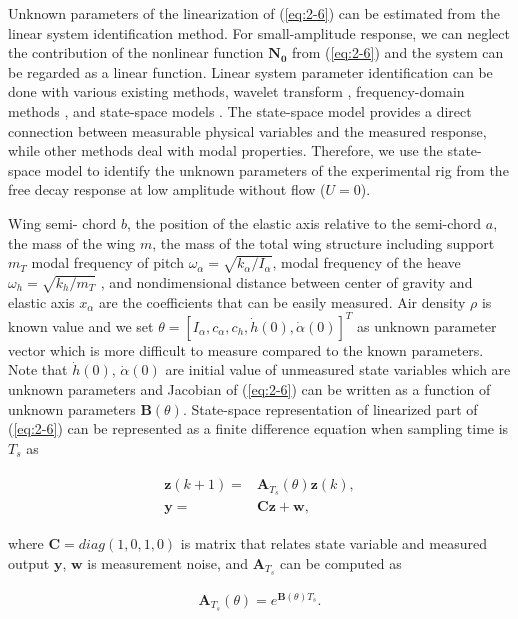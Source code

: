 \documentclass[openacc]{rsproca_new}%
\def\vec#1{\ensuremath{\mathbf{#1}}}
\newcommand{\Eref}[1]{(\ref{#1})}
\begin{document}
Unknown parameters of the linearization of \Eref{eq:2-6} can be estimated from the linear system identification method. For small-amplitude response, we can neglect the contribution of the nonlinear function $\vec{N_0}$ from \Eref{eq:2-6} and the system can be regarded as a linear function. Linear system parameter identification can be done with various existing methods, wavelet transform \cite{ruzzene1997natural}, frequency-domain methods \cite{pintelon2012system}, and state-space models \cite{ljung2001system}. The state-space model provides a direct connection between measurable physical variables and the measured response, while other methods deal with modal properties. Therefore, we use the state-space model to identify the unknown parameters of the experimental rig from the free decay response at low amplitude without flow ($U=0$).

Wing semi- chord $b$, the position of the elastic axis relative to the semi-chord $a$, the mass of the wing $m$, the mass of the total wing structure including support $m_T$
modal frequency of pitch $\omega_\alpha=\sqrt{k_\alpha / I_\alpha}$, modal frequency of the heave $\omega_h=\sqrt{k_h/m_T}$ , and nondimensional distance between center of gravity and elastic axis $x_\alpha$ are the coefficients that can be easily measured.
Air density $\rho$ is known value and we set $\theta=[I_\alpha,c_\alpha,c_h,\dot h(0),\dot \alpha(0)]^T$ as unknown parameter vector which is more difficult to measure compared to the known parameters. Note that $\dot h(0)$, $\dot \alpha(0)$ are initial value of unmeasured state variables which are unknown parameters and Jacobian of \Eref{eq:2-6} can be written as a function of unknown parameters $\vec{B}(\theta)$. State-space representation of linearized part of \Eref{eq:2-6} can be represented as a finite difference equation when sampling time is $T_s$ as

\begin{align}\label{eq:2-7}
  \begin{split}
\vec{z}(k+1)=&\vec{A}_{T_s}(\theta)\vec{z}(k),\\
\vec{y}=&\vec{C}\vec{z}+\vec{w},
\end{split}
\end{align}

\noindent where $\vec{C}=diag(1,0,1,0)$ is matrix that relates state variable and measured output $\vec{y}$, $\vec{w}$ is measurement noise, and $\vec{A}_{T_s}$ can be computed as

\begin{align}\label{eq:2-8}
\vec{A}_{T_s}(\theta)=e^{\vec{B}(\theta)T_s}.
\end{align}
\end{document}
